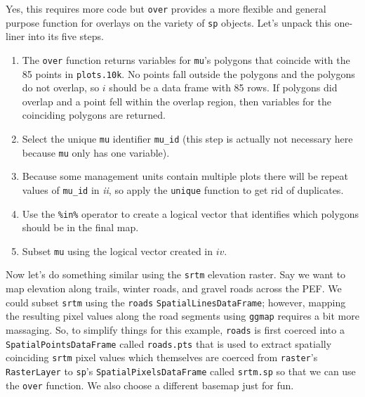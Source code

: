 \documentclass[]{krantz}
\makeatletter
\newenvironment{Shaded}{\begin{snugshade}}{\end{snugshade}}
\newcommand{\FloatTok}[1]{\textcolor[rgb]{0.06,0.06,0.06}{#1}}
\newcommand{\KeywordTok}[1]{\textcolor[rgb]{0.27,0.27,0.27}{\textbf{#1}}}
\newcommand{\NormalTok}[1]{#1}
\newcommand{\OperatorTok}[1]{\textcolor[rgb]{0.43,0.43,0.43}{\textbf{#1}}}
\newcommand{\StringTok}[1]{\textcolor[rgb]{0.5,0.5,0.5}{#1}}
\providecommand{\tightlist}{%
  \setlength{\itemsep}{0pt}\setlength{\parskip}{0pt}}
\newenvironment{kframe}{%
\medskip{}
\setlength{\fboxsep}{.8em}
 \def\at@end@of@kframe{}%
 \ifinner\ifhmode%
  \def\at@end@of@kframe{\end{minipage}}%
  \begin{minipage}{\columnwidth}%
 \fi\fi%
 \def\FrameCommand##1{\hskip\@totalleftmargin \hskip-\fboxsep
 \colorbox{shadecolor}{##1}\hskip-\fboxsep
     \hskip-\linewidth \hskip-\@totalleftmargin \hskip\columnwidth}%
 \MakeFramed {\advance\hsize-\width
   \@totalleftmargin\z@ \linewidth\hsize
   \@setminipage}}%
 {\par\unskip\endMakeFramed%
 \at@end@of@kframe}
\renewenvironment{Shaded}{\begin{kframe}}{\end{kframe}}
\makeatother
\begin{document}
Yes, this requires more code but \texttt{over} provides a more flexible and general purpose function for overlays on the variety of \texttt{sp} objects. Let's unpack this one-liner into its five steps.

\begin{Shaded}
\end{Shaded}

\begin{enumerate}
\def\labelenumi{\roman{enumi}.}
\tightlist
\item
  The \texttt{over} function returns variables for \texttt{mu}'s polygons that coincide with the 85 points in \texttt{plots.10k}. No points fall outside the polygons and the polygons do not overlap, so \(i\) should be a data frame with 85 rows. If polygons did overlap and a point fell within the overlap region, then variables for the coinciding polygons are returned.
\item
  Select the unique \texttt{mu} identifier \texttt{mu\_id} (this step is actually not necessary here because \texttt{mu} only has one variable).
\item
  Because some management units contain multiple plots there will be repeat values of \texttt{mu\_id} in \emph{ii}, so apply the \texttt{unique} function to get rid of duplicates.
\item
  Use the \texttt{\%in\%} operator to create a logical vector that identifies which polygons should be in the final map.
\item
  Subset \texttt{mu} using the logical vector created in \(iv\).
\end{enumerate}

Now let's do something similar using the \texttt{srtm} elevation raster. Say we want to map elevation along trails, winter roads, and gravel roads across the PEF. We could subset \texttt{srtm} using the \texttt{roads} \texttt{SpatialLinesDataFrame}; however, mapping the resulting pixel values along the road segments using \texttt{ggmap} requires a bit more massaging. So, to simplify things for this example, \texttt{roads} is first coerced into a \texttt{SpatialPointsDataFrame} called \texttt{roads.pts} that is used to extract spatially coinciding \texttt{srtm} pixel values which themselves are coerced from \texttt{raster}'s \texttt{RasterLayer} to \texttt{sp}'s \texttt{SpatialPixelsDataFrame} called \texttt{srtm.sp} so that we can use the \texttt{over} function. We also choose a different basemap just for fun.
\end{document}
